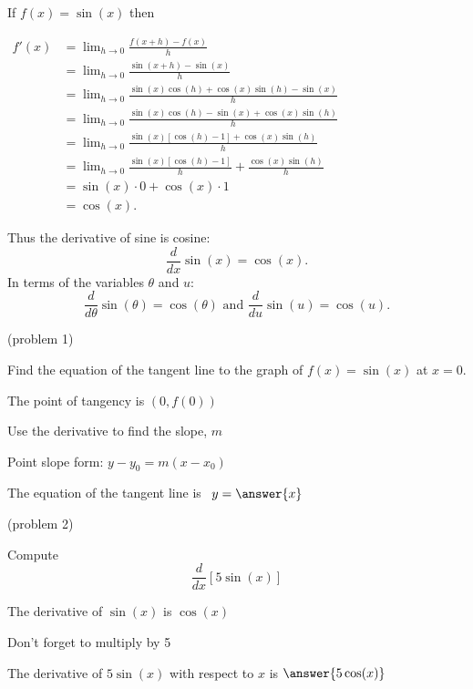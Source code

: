 \documentclass[handout]{ximera}
\begin{document}
\begin{explanation} %
If $f(x) = \sin(x)$ then
\begin{center}
$\begin{aligned}
f'(x) &= \lim_{h \to 0} \frac{f(x+h)-f(x)}{h} \\[5pt]
&= \lim_{h \to 0} \frac{\sin(x+h) - \sin(x)}{h}\\[5pt]
&=  \lim_{h \to 0} \frac{\sin(x)\cos(h) + \cos(x)\sin(h) - \sin(x)}{h}\\[5pt]
&=  \lim_{h \to 0} \frac{\sin(x)\cos(h)  - \sin(x) + \cos(x)\sin(h)}{h}\\[5pt]
&=  \lim_{h \to 0} \frac{\sin(x)[\cos(h) -1] + \cos(x)\sin(h)}{h}\\[5pt]
&=  \lim_{h \to 0} \frac{\sin(x)[\cos(h) -1]}{h} + \frac{\cos(x)\sin(h)}{h}\\[5pt]
&=  \sin(x) \cdot 0 + \cos(x) \cdot 1 \\[5pt]
&= \cos(x).
\end{aligned}$
\end{center}
Thus the derivative of sine is cosine:
\[
\frac{d}{dx}\sin(x) = \cos(x).
\]
In terms of the variables $\theta$ and $u$:
\[
\frac{d}{d\theta}\sin(\theta) = \cos(\theta) \text{  and  } \frac{d}{du}\sin(u) = \cos(u).
\]
\end{explanation}



\begin{problem}(problem 1)

Find the equation of the tangent line to the graph of $f(x) = \sin(x)$ at $x=0.$

\begin{hint}
The point of tangency is $(0, f(0))$
\end{hint}
\begin{hint}
Use the derivative to find the slope, $m$
\end{hint}
\begin{hint}
Point slope form: $y-y_0 = m(x-x_0)$
\end{hint}

The equation of the tangent line is \ $y = \answer{x}$

\end{problem}





\begin{problem}(problem 2)
  
Compute 
\[
\frac{d}{dx} \left[5\sin(x)\right]
\]
  
\begin{hint}
The derivative of $\sin(x)$ is $\cos(x)$
\end{hint}
\begin{hint}
Don't forget to multiply by 5
\end{hint}
		
The derivative of $5\sin(x)$ with respect to $x$ is
$\answer{5\cos(x)}$

\end{problem}
\end{document}
